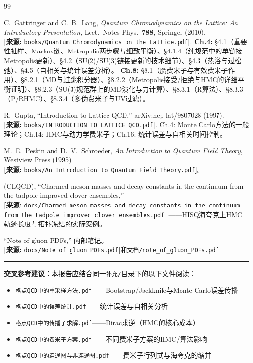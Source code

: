 \documentclass[12pt,a4paper]{ctexart}
\theoremstyle{definition}
\begin{document}
\begin{thebibliography}{99}

C.~Gattringer and C.~B.~Lang,
\textit{Quantum Chromodynamics on the Lattice: An Introductory Presentation},
Lect.\ Notes Phys.\ \textbf{788}, Springer (2010).
\\\textbf{[来源:} \texttt{books/Quantum Chromodynamics on the Lattice.pdf}\textbf{]}.
\textbf{Ch.4:} §4.1（重要性抽样、Markov链、Metropolis两步骤与细致平衡）、§4.1.4（纯规范中的单链接Metropolis更新）、§4.2（SU(2)/SU(3)链接更新的技术细节）、§4.3（热浴与过松弛）、§4.5（自相关与统计误差分析）。
\textbf{Ch.8:} §8.1（赝费米子与有效费米子作用）、§8.2.1（MD与蛙跳积分器）、§8.2.2（Metropolis接受/拒绝与HMC的详细平衡证明）、§8.2.3（SU(3)规范群上的MD演化与力计算）、§8.3.1（R算法）、§8.3.3（P/RHMC）、§8.3.4（多伪费米子与UV过滤）。

R.~Gupta,
``Introduction to Lattice QCD,''
arXiv:hep-lat/9807028 (1997).
\\\textbf{[来源:} \texttt{books/INTRODUCTION TO LATTICE QCD.pdf}\textbf{]}.
Ch.4: Monte Carlo方法的一般理论；Ch.14: HMC与动力学费米子；Ch.16: 统计误差与自相关时间控制。

M.~E.~Peskin and D.~V.~Schroeder,
\textit{An Introduction to Quantum Field Theory}, Westview Press (1995).
\\\textbf{[来源:} \texttt{books/An Introduction to Quantum Field Theory.pdf}\textbf{]}。

(CLQCD),
``Charmed meson masses and decay constants in the continuum from the tadpole improved clover ensembles,''
\\\textbf{[来源:} \texttt{docs/Charmed meson masses and decay constants in the continuum from the tadpole improved clover ensembles.pdf}\textbf{]}
——HISQ海夸克上HMC轨迹长度与拓扑冻结的实际案例。

``Note of gluon PDFs,'' 内部笔记。
\\\textbf{[来源:} \texttt{docs/Note of gluon PDFs.pdf}\textbf{]}和\texttt{文档/note\_of\_gluon\_PDFs.pdf}

\end{thebibliography}

\vspace{0.5cm}
\noindent\rule{\textwidth}{0.5pt}
\small
\textbf{交叉参考建议：}本报告应结合同一\texttt{补充/}目录下的以下文件阅读：
\begin{itemize}[nosep]
    \item \texttt{格点QCD中的重采样方法.pdf}——Bootstrap/Jackknife与Monte Carlo误差传播
    \item \texttt{格点QCD中的误差统计.pdf}——统计误差与自相关分析
    \item \texttt{格点QCD中的传播子求解.pdf}——Dirac求逆（HMC的核心成本）
    \item \texttt{格点QCD中的费米子方案.pdf}——不同费米子方案的HMC/算法影响
    \item \texttt{格点QCD中的连通图与非连通图.pdf}——费米子行列式与海夸克的缩并
\end{itemize}
\end{document}
